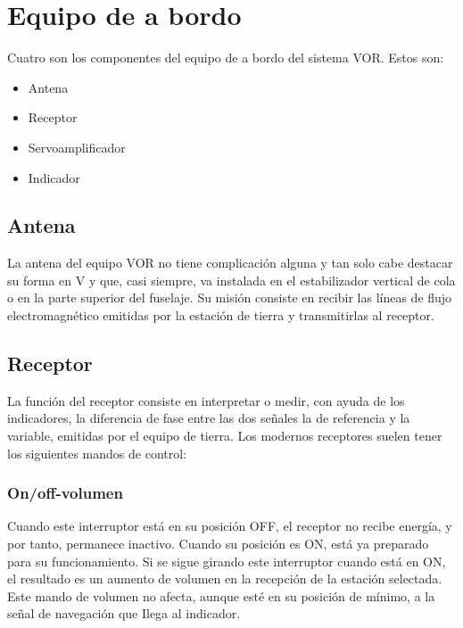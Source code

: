 
\section{Equipo de a bordo}

Cuatro son los componentes del equipo de a bordo del sistema VOR. Estos son:

\begin{itemize}
\item Antena 

\item Receptor


\item Servoamplificador 

\item Indicador

\end{itemize}

\subsection{Antena }

La antena del equipo VOR no tiene complicación alguna y tan solo cabe destacar su forma en V y que, casi siempre, va instalada en el estabilizador vertical de cola o en la parte superior del fuselaje. Su misión consiste en recibir las líneas de flujo electromagnético emitidas por la estación de tierra y transmitirlas al receptor.

\subsection{Receptor }

La función del receptor consiste en interpretar o medir, con ayuda de los indicadores, la diferencia de fase entre las dos señales la de referencia y la  variable, emitidas por el equipo de tierra. Los modernos receptores suelen tener los siguientes mandos de control:

\subsubsection{On/off-volumen}
Cuando este interruptor está en su posición OFF, el receptor no recibe energía, y  por tanto, permanece inactivo. Cuando su posición es ON, está ya preparado para su funcionamiento. Si se sigue girando este interruptor cuando está en ON, el  resultado es un aumento de volumen en la recepción de la estación selectada. Este mando de volumen no afecta, aunque esté en su posición de mínimo, a la señal de navegación que Ilega al indicador.

